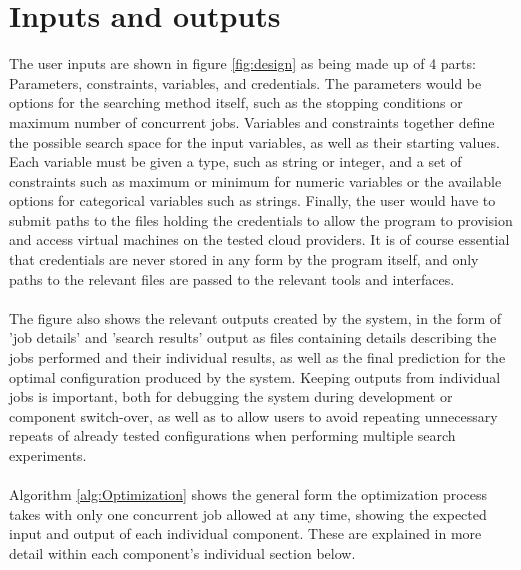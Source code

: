 \documentclass{report}
\begin{document}
\section{Inputs and outputs}
The user inputs are shown in figure \ref{fig:design} as being made up of 4 parts: Parameters, constraints, variables, and credentials. The parameters would be options for the searching method itself, such as the stopping conditions or maximum number of concurrent jobs. Variables and constraints together define the possible search space for the input variables, as well as their starting values. Each variable must be given a type, such as string or integer, and a set of constraints such as maximum or minimum for numeric variables or the available options for categorical variables such as strings. Finally, the user would have to submit paths to the files holding the credentials to allow the program to provision and access virtual machines on the tested cloud providers. It is of course essential that credentials are never stored in any form by the program itself, and only paths to the relevant files are passed to the relevant tools and interfaces.
\paragraph{}
The figure also shows the relevant outputs created by the system, in the form of 'job details' and 'search results' output as files containing details describing the jobs performed and their individual results, as well as the final prediction for the optimal configuration produced by the system. Keeping outputs from individual jobs is important, both for debugging the system during development or component switch-over, as well as to allow users to avoid repeating unnecessary repeats of already tested configurations when performing multiple search experiments.
\paragraph{}
Algorithm \ref{alg:Optimization} shows the general form the optimization process takes with only one concurrent job allowed at any time, showing the expected input and output of each individual component. These are explained in more detail within each component's individual section below.
\end{document}
